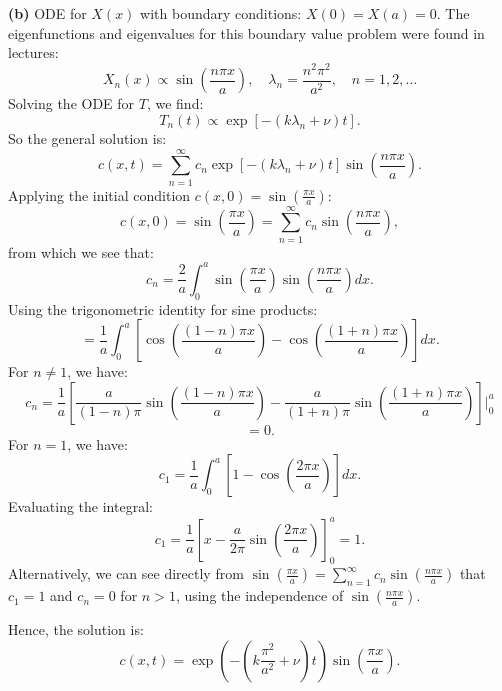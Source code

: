 \documentclass[10pt,landscape]{article}
\begin{document}
\begin{multicols}{2}
\textbf{(b)} ODE for \( X(x) \) with boundary conditions: \( X(0) = X(a) = 0 \). The eigenfunctions and eigenvalues for this boundary value problem were found in lectures:\\
\[
X_n(x) \propto \sin \left( \frac{n\pi x}{a} \right), \quad \lambda_n = \frac{n^2 \pi^2}{a^2}, \quad n = 1, 2, \dots
\]
Solving the ODE for \( T \), we find:\\
\[
T_n(t) \propto \exp \left[ - (k \lambda_n + \nu) t \right].
\]
So the general solution is:\\
\[
c(x, t) = \sum_{n=1}^{\infty} c_n \exp \left[ - (k \lambda_n + \nu) t \right] \sin \left( \frac{n\pi x}{a} \right).
\]
Applying the initial condition \( c(x, 0) = \sin \left( \frac{\pi x}{a} \right) \):\\
\[
c(x, 0) = \sin \left( \frac{\pi x}{a} \right) = \sum_{n=1}^{\infty} c_n \sin \left( \frac{n\pi x}{a} \right),
\]
from which we see that:\\
\[
c_n = \frac{2}{a} \int_0^a \sin \left( \frac{\pi x}{a} \right) \sin \left( \frac{n\pi x}{a} \right) dx.
\]
Using the trigonometric identity for sine products:\\
\[
= \frac{1}{a} \int_0^a \left[ \cos \left( \frac{(1 - n)\pi x}{a} \right) - \cos \left( \frac{(1 + n)\pi x}{a} \right) \right] dx.
\]
For \( n \neq 1 \), we have:\\
\small
\[
c_n = \frac{1}{a} \left[ \frac{a}{(1 - n)\pi} \sin \left( \frac{(1 - n)\pi x}{a} \right) - \frac{a}{(1 + n)\pi} \sin \left( \frac{(1 + n)\pi x}{a} \right) \right] \Bigg|_0^a\]\[ = 0.
\]
\normalsize
For \( n = 1 \), we have:\\
\[
c_1 = \frac{1}{a} \int_0^a \left[ 1 - \cos \left( \frac{2\pi x}{a} \right) \right] dx.
\]
Evaluating the integral:\\
\[
c_1 = \frac{1}{a} \left[ x - \frac{a}{2\pi} \sin \left( \frac{2\pi x}{a} \right) \right]_0^a = 1.
\]
Alternatively, we can see directly from \( \sin \left( \frac{\pi x}{a} \right) = \sum_{n=1}^{\infty} c_n \sin \left( \frac{n\pi x}{a} \right) \) that \( c_1 = 1 \) and \( c_n = 0 \) for \( n > 1 \), using the independence of \( \sin \left( \frac{n\pi x}{a} \right) \).

Hence, the solution is:\\
\[
c(x, t) = \exp \left( - \left( k \frac{\pi^2}{a^2} + \nu \right) t \right) \sin \left( \frac{\pi x}{a} \right).
\]


\end{multicols}
\end{document}
